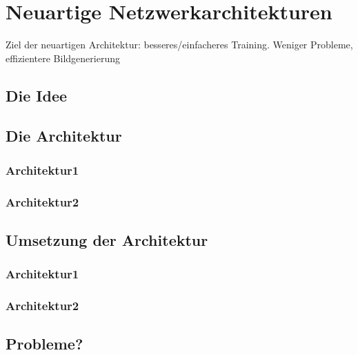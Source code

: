 \section{Neuartige Netzwerkarchitekturen}

Ziel der neuartigen Architektur: besseres/einfacheres Training. Weniger Probleme, effizientere Bildgenerierung
\subsection{Die Idee}


\subsection{Die Architektur}
\subsubsection{Architektur1}
\subsubsection{Architektur2}

\subsection{Umsetzung der Architektur}
\subsubsection{Architektur1}
\subsubsection{Architektur2}

\subsection{Probleme?}
